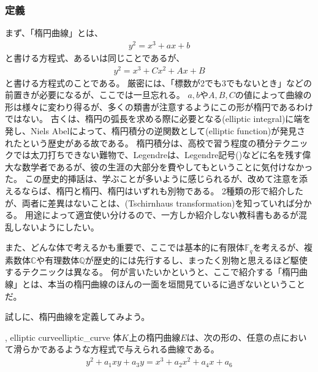 \subsubsection{定義}
まず、「楕円曲線」とは、
\begin{align}
\label{eq:elliptic_curve_1}
y^2 = x^3 + ax + b
\end{align}
と書ける方程式、あるいは同じことであるが、
\begin{align}
\label{eq:elliptic_curve_2}
y^2 = x^3 + Cx^2 + Ax + B
\end{align}
と書ける方程式のことである。
厳密には、「標数が2でも3でもないとき」などの前置きが必要になるが、ここでは一旦忘れる。
$a,b$や$A,B,C$の値によって曲線の形は様々に変わり得るが、多くの類書が注意するようにこの形が楕円であるわけではない。
古くは、楕円の弧長を求める際に必要となる(elliptic integral)に端を発し、Niels Abelによって、楕円積分の逆関数として(elliptic function)が発見されたという歴史がある故である。
楕円積分は、高校で習う程度の積分テクニックでは太刀打ちできない難物で、Legendreは、Legendre記号()などに名を残す偉大な数学者であるが、彼の生涯の大部分を費やしてもということに気付けなかった。
この歴史的挿話は、学ぶことが多いように感じられるが、改めて注意を添えるならば、楕円と楕円、楕円はいずれも別物である。
2種類の形で紹介したが、両者に差異はないことは、(Tschirnhaus transformation)を知っていれば分かる。
用途によって適宜使い分けるので、一方しか紹介しない教科書もあるが混乱しないようにしたい。

また、どんな体で考えるかも重要で、ここでは基本的に有限体$\mathbb{F}_q$を考えるが、複素数体$\mathbb{C}$や有理数体$\mathbb{Q}$が歴史的には先行するし、まったく別物と思えるほど駆使するテクニックは異なる。
何が言いたいかというと、ここで紹介する「楕円曲線」とは、本当の楕円曲線のほんの一面を垣間見ているに過ぎないということだ。

試しに、楕円曲線を定義してみよう。

\begin{Defi}{, elliptic curve}{elliptic_curve}
体$K$上の楕円曲線$E$は、次の形の、任意の点において滑らかであるような方程式で与えられる曲線である。
\begin{align*}
y^2 + a_1xy + a_3y = x^3 + a_2x^2 + a_4x + a_6
\end{align*}
\end{Defi}

